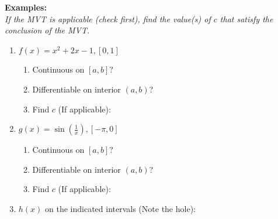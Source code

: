 \documentclass[12pt]{report}
\begin{document}
\textbf{Examples:} \\

\textit{If the MVT is applicable (check first), find the value(s) of $c$ that satisfy the conclusion of the MVT.}  \\

\begin{enumerate}

\item $f(x) = x^2 + 2x -1, [0,1]$ \\

	\begin{enumerate}
	
	\item Continuous on $[a,b]?$
	
	\vspace{0.5 in}
	
	\item Differentiable on interior $(a,b)$? 
	
	\vspace{0.5 in}
	
	\item Find $c$ (If applicable): 
	
	\vspace{1 in}
	
	\end{enumerate}
	
\item $g(x) = \sin(\frac{1}{x}), [-\pi,0]$ \\

\begin{enumerate}
	
	\item Continuous on $[a,b]?$
	
	\vspace{0.5 in}
	
	\item Differentiable on interior $(a,b)$? 
	
	\vspace{0.5 in}
	
	\item Find $c$ (If applicable): 
	
	\vspace{0.5 in}

\end{enumerate}

\item $h(x)$ on the indicated intervals (Note the hole):

\begin{multicols}{2}


\end{multicols}
\end{enumerate}
\end{document}
